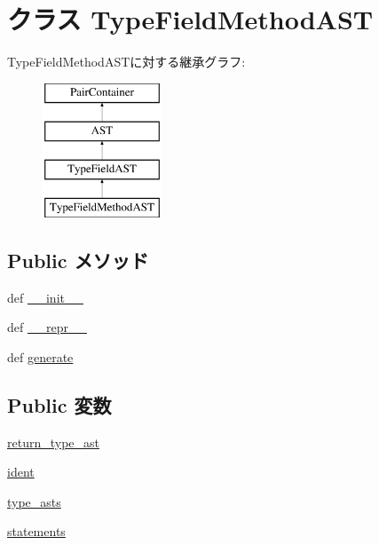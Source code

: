 \hypertarget{classslicc_1_1ast_1_1TypeFieldMethodAST_1_1TypeFieldMethodAST}{
\section{クラス TypeFieldMethodAST}
\label{classslicc_1_1ast_1_1TypeFieldMethodAST_1_1TypeFieldMethodAST}
}
TypeFieldMethodASTに対する継承グラフ:\begin{figure}[H]
\begin{center}
\leavevmode
\includegraphics[height=4cm]{classslicc_1_1ast_1_1TypeFieldMethodAST_1_1TypeFieldMethodAST}
\end{center}
\end{figure}
\subsection*{Public メソッド}
\begin{DoxyCompactItemize}
\item 
def \hyperlink{classslicc_1_1ast_1_1TypeFieldMethodAST_1_1TypeFieldMethodAST_ac775ee34451fdfa742b318538164070e}{\_\-\_\-init\_\-\_\-}
\item 
def \hyperlink{classslicc_1_1ast_1_1TypeFieldMethodAST_1_1TypeFieldMethodAST_ad8b9328939df072e4740cd9a63189744}{\_\-\_\-repr\_\-\_\-}
\item 
def \hyperlink{classslicc_1_1ast_1_1TypeFieldMethodAST_1_1TypeFieldMethodAST_a4555d1cee0dccf3942ea35fe86de2e8e}{generate}
\end{DoxyCompactItemize}
\subsection*{Public 変数}
\begin{DoxyCompactItemize}
\item 
\hyperlink{classslicc_1_1ast_1_1TypeFieldMethodAST_1_1TypeFieldMethodAST_aa06741eb3d77ab5fa58808028864cebd}{return\_\-type\_\-ast}
\item 
\hyperlink{classslicc_1_1ast_1_1TypeFieldMethodAST_1_1TypeFieldMethodAST_a2fe57e2d3d2cba9a3aeba2f629eaa78b}{ident}
\item 
\hyperlink{classslicc_1_1ast_1_1TypeFieldMethodAST_1_1TypeFieldMethodAST_a3c3136174797ed0e6932720492b5efb4}{type\_\-asts}
\item 
\hyperlink{classslicc_1_1ast_1_1TypeFieldMethodAST_1_1TypeFieldMethodAST_aa25d5649a404c698dcacaa271a285c92}{statements}
\end{DoxyCompactItemize}


